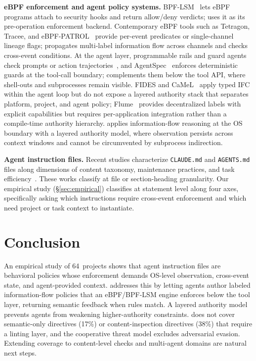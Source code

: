 \textbf{eBPF enforcement and agent policy systems.}
BPF-LSM~\cite{singh2019krsi,linuxbpflsm} lets eBPF programs attach to
security hooks and return allow/deny verdicts; \sys{} uses it as its
pre-operation enforcement backend. Contemporary eBPF tools such as Tetragon,
Tracee, and eBPF-PATROL~\cite{ciliumtetragon,aquasecuritytracee,ghimire2025ebpfpatrol} provide
per-event predicates or single-channel lineage flags; \sys{} propagates
multi-label information flow across channels and checks cross-event
conditions. At the agent layer, programmable rails and guard agents
check prompts or action trajectories~\cite{rebedea2023nemo,xiang2025guardagent},
and AgentSpec~\cite{wang2025agentspec} enforces deterministic guards at
the tool-call boundary; \sys{} complements them below the tool API, where
shell-outs and subprocesses remain visible. FIDES and
CaMeL~\cite{costa2025fides,debenedetti2025camel} apply typed IFC within
the agent loop but do not expose a layered authority stack that separates
platform, project, and agent policy; Flume~\cite{flume} provides
decentralized labels with explicit capabilities but requires
per-application integration rather than a compile-time authority
hierarchy. \sys{} applies information-flow reasoning at the OS boundary
with a layered authority model, where observation persists across context
windows and cannot be circumvented by subprocess indirection.

\textbf{Agent instruction files.}
Recent studies characterize \texttt{CLAUDE.md} and \texttt{AGENTS.md}
files along dimensions of content taxonomy, maintenance practices, and
task
efficiency~\cite{chatlatanagulchai2025manifests,chatlatanagulchai2025agentreadmes,
santos2025claudeconfig,lulla2026agentsmd}. These works classify at file or
section-heading granularity. Our empirical study
(\S\ref{sec:empirical}) classifies at statement level along four axes,
specifically asking which instructions require cross-event enforcement
and which need project or task context to instantiate.

\section{Conclusion}
\label{sec:conclusion}

An empirical study of 64~projects shows that agent instruction files are
behavioral policies whose enforcement demands OS-level observation,
cross-event state, and agent-provided context. \sys{} addresses this by
letting agents author labeled information-flow policies that an eBPF/BPF-LSM
engine enforces below the tool layer, returning semantic feedback when rules
match. A layered authority model prevents agents from weakening
higher-authority constraints. \sys{} does not cover semantic-only
directives (17\%) or content-inspection directives (38\%) that require a
linting layer, and the cooperative threat model excludes adversarial
evasion. Extending coverage to content-level checks and multi-agent
domains are natural next steps.
